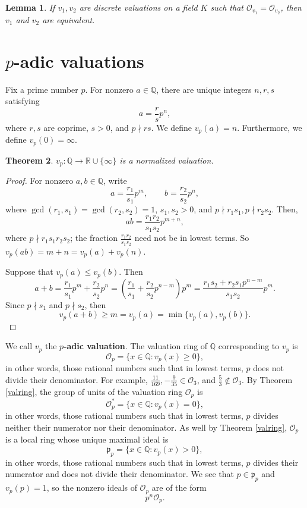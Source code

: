 \documentclass{article}
\theoremstyle{plain}
\newtheorem{theorem}{Theorem}
\newtheorem{lemma}[theorem]{Lemma}
\theoremstyle{definition}
\begin{document}
\begin{lemma}
If $v_1,v_2$ are discrete valuations on a field $K$ such that $\mathcal{O}_{v_1}=\mathcal{O}_{v_2}$, then 
$v_1$ and $v_2$ are equivalent. 
\end{lemma}


\section{$p$-adic valuations}
Fix a prime number $p$. For nonzero $a \in \mathbb{Q}$, there are unique integers $n,r,s$ satisfying
\[
a=\frac{r}{s}p^n,
\]
where $r,s$ are coprime, $s>0$, and $p \nmid rs$. 
We define $v_p(a)=n$. 
Furthermore, we define $v_p(0)=\infty$. 


\begin{theorem}
$v_p:\mathbb{Q} \to \mathbb{R} \cup \{\infty\}$ is a normalized valuation.
\end{theorem}
\begin{proof}
For nonzero $a,b \in \mathbb{Q}$,
write
\[
a=\frac{r_1}{s_1} p^m, \qquad b = \frac{r_2}{s_2}p^n,
\]
where $\gcd(r_1,s_1)=\gcd(r_2,s_2)=1$, $s_1,s_2>0$, and $p
\nmid r_1s_1, p \nmid r_2s_2$. Then,
\[
ab = \frac{r_1r_2}{s_1s_2} p^{m+n},
\]
where $p \nmid r_1s_1r_2s_2$; the fraction $\frac{r_1r_2}{s_1s_2}$ need not be in lowest terms. 
So $v_p(ab)=m+n=v_p(a)+v_p(n)$.

Suppose that $v_p(a) \leq   v_p(b)$. Then
\[
a+b = \frac{r_1}{s_1} p^m +  \frac{r_2}{s_2}p^n
= \left( \frac{r_1}{s_1} +\frac{r_2}{s_2} p^{n-m}\right)p^m
=\frac{r_1s_2+r_2s_1p^{n-m}}{s_1s_2} p^m.
\]
Since $p \nmid s_1$ and $p \nmid s_2$, 
then
\[
v_p(a+b) \geq m = v_p(a) = \min\{v_p(a),v_p(b)\}.
\]
\end{proof}

We call $v_p$ the \textbf{$p$-adic valuation}.
The valuation ring of $\mathbb{Q}$ corresponding to  $v_p$ is
\[
\mathcal{O}_p = \{x \in \mathbb{Q}: v_p(x) \geq 0\}, 
\]
in other words, those rational numbers such that in lowest terms, $p$ does not divide their denominator. For example,
$\frac{11}{169}, -\frac{9}{35} \in \mathcal{O}_3$, and $\frac{5}{3} \not \in \mathcal{O}_3$. 
By Theorem \ref{valring}, the group of units of the valuation ring $\mathcal{O}_p$ is
\[
\mathcal{O}_p^*= \{x \in \mathbb{Q}: v_p(x)=0\},
\]
in other words, those rational numbers such that in lowest terms, $p$ divides neither their numerator nor their denominator. 
As well by Theorem \ref{valring}, $\mathcal{O}_p$ is a local ring whose unique maximal ideal is
\[
\mathfrak{p}_p = \{x \in \mathbb{Q}: v_p(x)>0\},
\]
in other words, those rational numbers such that in lowest terms, $p$ divides their numerator and does not divide their
denominator. 
We see that $p \in \mathfrak{p}_p$ and $v_p(p)=1$, so the nonzero ideals of $\mathcal{O}_p$ are of the form
\[
p^n \mathcal{O}_p.
\]
\end{document}
